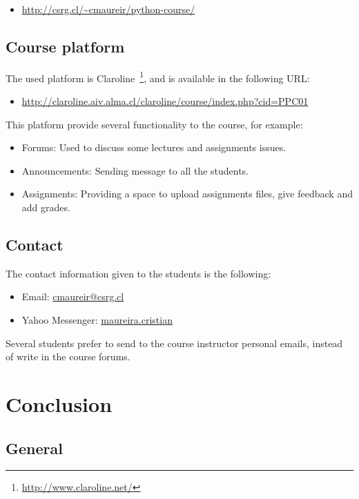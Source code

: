 \documentclass[letter, 10pt]{article}
\begin{document}
\begin{itemize}
    \item \url{http://csrg.cl/~cmaureir/python-course/}
\end{itemize}

\subsection{Course platform}

The used platform is Claroline~\footnote{\url{http://www.claroline.net/}},
and is available in the following URL:

\begin{itemize}
    \item \url{http://claroline.aiv.alma.cl/claroline/course/index.php?cid=PPC01}
\end{itemize}

This platform provide several functionality to the course,
for example:
\begin{itemize}
    \item Forums: Used to discuss some lectures and assignments issues.
    \item Announcements: Sending message to all the students.
    \item Assignments: Providing a space to upload assignments files, give feedback and add grades.
\end{itemize}

\subsection{Contact}

The contact information given to the students
is the following:

\begin{itemize}
    \item Email: \url{cmaureir@csrg.cl}
    \item Yahoo Messenger: \url{maureira.cristian}
\end{itemize}

Several students prefer to send to the course instructor personal emails,
instead of write in the course forums.

\section{Conclusion}

\subsection{General}
\end{document}
